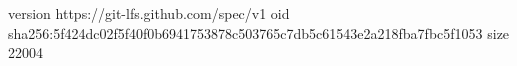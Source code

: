 version https://git-lfs.github.com/spec/v1
oid sha256:5f424dc02f5f40f0b6941753878c503765c7db5c61543e2a218fba7fbc5f1053
size 22004
